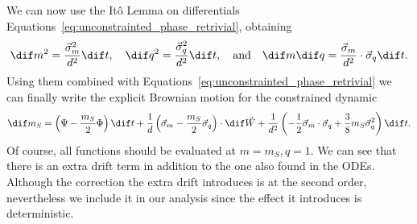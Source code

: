 We can now use the Itô Lemma on differentials Equations~\eqref{eq:unconstrainted_phase_retrivial},
obtaining 
\[
  \dif m^2 =    \frac{\vec{\sigma}_m^2}{d^2}\dif t, \quad
  \dif q^2 =    \frac{\vec{\sigma}_q^2}{d^2}\dif t, \quad\text{and}\quad
  \dif m \dif q = \frac{\vec{\sigma}_m  }{d^2}\cdot \vec{\sigma}_q \dif t.
\]
Using them combined with Equations~\eqref{eq:unconstrainted_phase_retrivial} we can finally write
the explicit Brownian motion for the constrained dynamic
\begin{equation} \label{eq:constrained_brownian_motion}
  \dif m_S = \left(\Psi - \frac{m_S}{2}\Phi\right)\dif t
            + \frac{1}{d}\left(\vec{\sigma}_m-\frac{m_S}{2}\vec{\sigma}_q\right)\cdot \dif \vec{W}
            + \frac{1}{d^2}\left(-\frac12\vec{\sigma}_m \cdot \vec{\sigma}_q +\frac38 m_S \vec{\sigma}^2_q\right)\dif t.
\end{equation}
Of course, all functions should be evaluated at \(m=m_S, q=1\).
We can see that there is an extra drift term in addition to the one also found in the ODEs.
Although the correction the extra drift introduces is at the second order,
nevertheless we include it in our analysis since the effect it introduces is deterministic.

